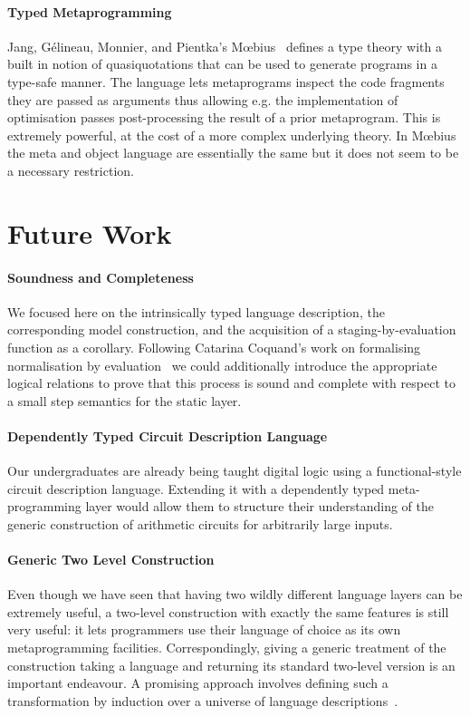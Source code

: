 \paragraph{Typed Metaprogramming}
Jang, Gélineau, Monnier, and Pientka's
Mœbius~\cite{DBLP:journals/pacmpl/JangGMP22} defines
a type theory with a built in notion of quasiquotations
that can be used to generate programs in a type-safe
manner.
%
The language lets metaprograms inspect the code fragments
they are passed as arguments thus allowing e.g. the
implementation of optimisation passes post-processing the
result of a prior metaprogram.
%
This is extremely powerful, at the cost of a more complex
underlying theory.
%
In Mœbius the meta and object language are essentially the
same but it does not seem to be a necessary restriction.

\section{Future Work}

\paragraph{Soundness and Completeness}
We focused here on the intrinsically typed language description,
the corresponding model construction, and the acquisition of a
staging-by-evaluation function as a corollary.
%
Following Catarina Coquand's work on formalising normalisation
by evaluation~\cite{DBLP:journals/lisp/Coquand02} we could
additionally introduce the appropriate logical relations to
prove that this process is sound and complete with respect
to a small step semantics for the static layer.

\paragraph{Dependently Typed Circuit Description Language}
Our undergraduates are already being taught digital logic
using a functional-style circuit description language.
Extending it with a dependently typed meta-programming
layer would allow them to structure their understanding
of the generic construction of arithmetic circuits for
arbitrarily large inputs.

\paragraph{Generic Two Level Construction}
Even though we have seen that having two wildly different
language layers can be extremely useful, a two-level
construction with exactly the same features is still very
useful: it lets programmers use their language of choice
as its own metaprogramming facilities.
%
Correspondingly, giving a generic treatment of the construction
taking a language and returning its standard two-level version
is an important endeavour.
%
A promising approach involves defining such a transformation
by induction over a universe of language
descriptions~\cite{DBLP:journals/jfp/AllaisACMM21}.
